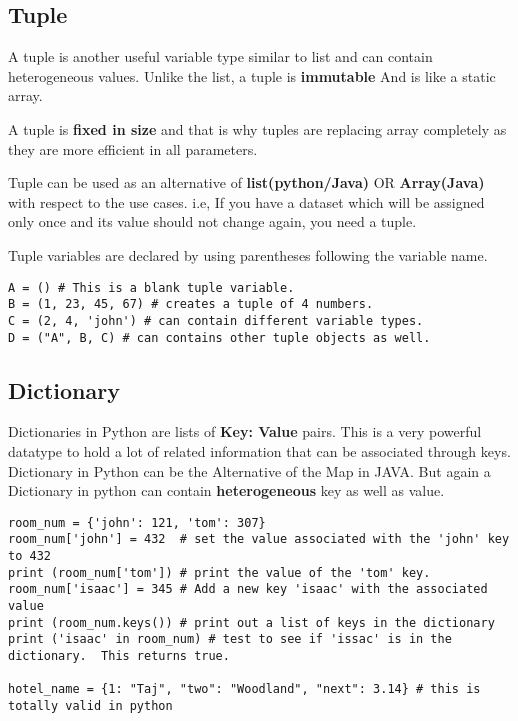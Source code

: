 \documentclass[a4paper,9pt]{extarticle}
\begin{document}
\begin{multicols*}{2}
\subsection{Tuple}
A tuple is another useful variable type similar to list and can contain heterogeneous values. Unlike the list, a tuple is \textbf{immutable} And is like a static array.

A tuple is \textbf{fixed in size} and that is why tuples are replacing array completely as they are more efficient in all parameters.

Tuple can be used as an alternative of \textbf{list(python/Java)} OR \textbf{Array(Java)} with respect to the use cases. i.e, If you have a dataset which will be assigned only once and its value should not change again, you need a tuple.

Tuple variables are declared by using parentheses \boxed{( )} following the variable name.

\begin{lstlisting}
A = () # This is a blank tuple variable.
B = (1, 23, 45, 67) # creates a tuple of 4 numbers.
C = (2, 4, 'john') # can contain different variable types.
D = ("A", B, C) # can contains other tuple objects as well.
\end{lstlisting}

\subsection{Dictionary}
Dictionaries in Python are lists of \textbf{Key: Value} pairs. This is a very powerful datatype to hold a lot of related information that can be associated through keys.
Dictionary in Python can be the Alternative of the Map in JAVA. But again a Dictionary in python can contain \textbf{heterogeneous} key as well as value.

\begin{lstlisting}
room_num = {'john': 121, 'tom': 307}
room_num['john'] = 432  # set the value associated with the 'john' key to 432
print (room_num['tom']) # print the value of the 'tom' key.
room_num['isaac'] = 345 # Add a new key 'isaac' with the associated value
print (room_num.keys()) # print out a list of keys in the dictionary
print ('isaac' in room_num) # test to see if 'issac' is in the dictionary.  This returns true.

hotel_name = {1: "Taj", "two": "Woodland", "next": 3.14} # this is totally valid in python
\end{lstlisting}


\end{multicols*}
\end{document}
